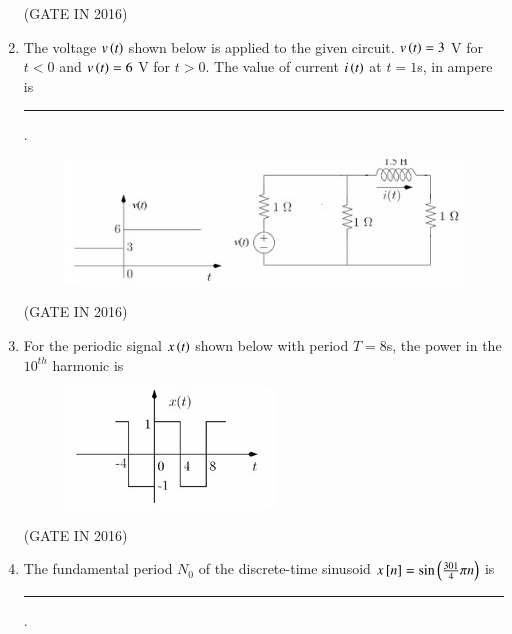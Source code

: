 \documentclass[journal,12pt,onecolumn]{IEEEtran}
\theoremstyle{remark}
\begin{document}
\begin{enumerate}
\hfill{(GATE IN 2016)}

\item The voltage $v\left(t\right)$ shown below is applied to the given circuit. $v\left(t\right) = 3$ V for $t < 0$ and $v\left(t\right) = 6$ V for $t > 0$. The value of current $i\left(t\right)$ at $t = 1$s, in ampere is \rule{2cm}{0.4pt}.
\begin{figure}[H]
\centering
\includegraphics[width=1\columnwidth]{figs/z15.jpg}
\caption*{}
\label{fig:z15}
\end{figure}

\hfill{(GATE IN 2016)}

\item For the periodic signal $x\left(t\right)$ shown below with period $T = 8$s, the power in the $10^{th}$ harmonic is
\begin{figure}[H]
\centering
\includegraphics[width=0.5\columnwidth]{figs/z16.jpg}
\caption*{}
\label{fig:z16}
\end{figure}

\hfill{(GATE IN 2016)}
\begin{enumerate}
\end{enumerate}

\item The fundamental period $N_0$ of the discrete-time sinusoid $x{}\left[n\right] = \sin\left(\frac{301}{4}\pi n\right)$ is \rule{2cm}{0.4pt}.


\end{enumerate}
\end{document}

